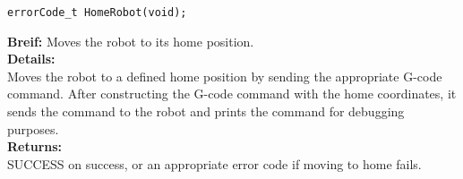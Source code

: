 \begin{verbatim}
errorCode_t HomeRobot(void);
\end{verbatim}
\textbf{Breif:} Moves the robot to its home position. \\
\textbf{Details:} \\
\hspace*{1cm}Moves the robot to a defined home position by sending the appropriate G-code command. After constructing the G-code command with the home coordinates, it sends the command to the robot and prints the command for debugging purposes. \\
\textbf{Returns:} \\
\hspace*{1cm}SUCCESS on success, or an appropriate error code if moving to home fails. \\[1em]




